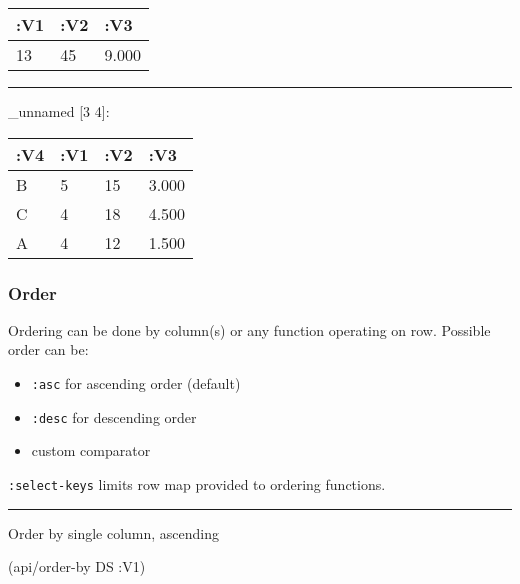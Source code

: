 \documentclass[]{article}
\newenvironment{Shaded}{\begin{snugshade}}{\end{snugshade}}
\newcommand{\KeywordTok}[1]{\textcolor[rgb]{0.13,0.29,0.53}{\textbf{#1}}}
\newcommand{\VariableTok}[1]{\textcolor[rgb]{0.00,0.00,0.00}{#1}}
\newcommand{\AttributeTok}[1]{\textcolor[rgb]{0.77,0.63,0.00}{#1}}
\newcommand{\NormalTok}[1]{#1}
\providecommand{\tightlist}{%
  \setlength{\itemsep}{0pt}\setlength{\parskip}{0pt}}
\begin{document}
\begin{longtable}[]{@{}lll@{}}
\toprule
:V1 & :V2 & :V3\tabularnewline
\midrule
\endhead
13 & 45 & 9.000\tabularnewline
\bottomrule
\end{longtable}

\begin{center}\rule{0.5\linewidth}{0.5pt}\end{center}

\begin{Shaded}
\end{Shaded}

\_unnamed {[}3 4{]}:

\begin{longtable}[]{@{}llll@{}}
\toprule
:V4 & :V1 & :V2 & :V3\tabularnewline
\midrule
\endhead
B & 5 & 15 & 3.000\tabularnewline
C & 4 & 18 & 4.500\tabularnewline
A & 4 & 12 & 1.500\tabularnewline
\bottomrule
\end{longtable}

\subsubsection{Order}\label{order}

Ordering can be done by column(s) or any function operating on row.
Possible order can be:

\begin{itemize}
\tightlist
\item
  \texttt{:asc} for ascending order (default)
\item
  \texttt{:desc} for descending order
\item
  custom comparator
\end{itemize}

\texttt{:select-keys} limits row map provided to ordering functions.

\begin{center}\rule{0.5\linewidth}{0.5pt}\end{center}

Order by single column, ascending

\begin{Shaded}
\begin{Highlighting}[]
\NormalTok{(api/order-by DS }\AttributeTok{:V1}\NormalTok{)}
\end{Highlighting}
\end{Shaded}
\end{document}
